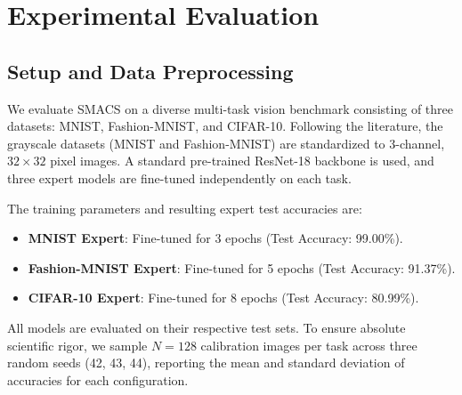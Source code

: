 \documentclass{article}
\theoremstyle{plain}
\theoremstyle{definition}
\theoremstyle{remark}
\begin{document}
\section{Experimental Evaluation}
\label{sec:experiments}

\subsection{Setup and Data Preprocessing}
We evaluate SMACS on a diverse multi-task vision benchmark consisting of three datasets: MNIST, Fashion-MNIST, and CIFAR-10. Following the literature, the grayscale datasets (MNIST and Fashion-MNIST) are standardized to 3-channel, $32 \times 32$ pixel images. A standard pre-trained ResNet-18 backbone is used, and three expert models are fine-tuned independently on each task.

The training parameters and resulting expert test accuracies are:
\begin{itemize}
    \item \textbf{MNIST Expert}: Fine-tuned for 3 epochs (Test Accuracy: 99.00\%).
    \item \textbf{Fashion-MNIST Expert}: Fine-tuned for 5 epochs (Test Accuracy: 91.37\%).
    \item \textbf{CIFAR-10 Expert}: Fine-tuned for 8 epochs (Test Accuracy: 80.99\%).
\end{itemize}
All models are evaluated on their respective test sets. To ensure absolute scientific rigor, we sample $N = 128$ calibration images per task across three random seeds (42, 43, 44), reporting the mean and standard deviation of accuracies for each configuration.
\end{document}
